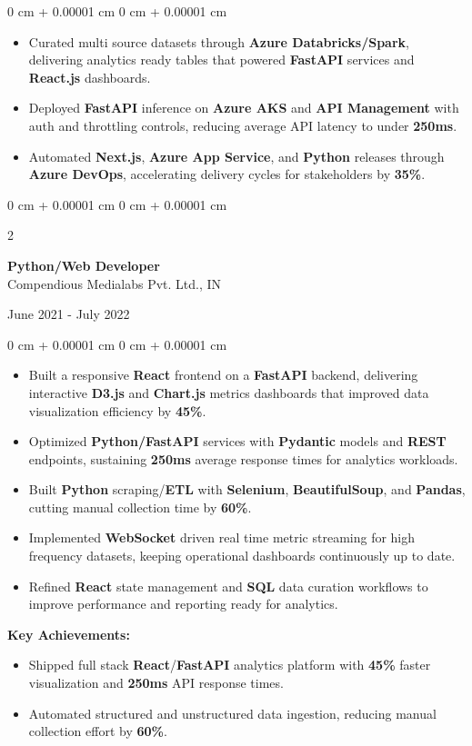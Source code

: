 \documentclass[10pt, letterpaper]{article}
\newenvironment{highlights}{
    \begin{itemize}[
        topsep=0.10 cm,
        parsep=0.10 cm,
        partopsep=0pt,
        itemsep=0pt,
        leftmargin=0 cm + 10pt
    ]
}{
    \end{itemize}
} %
\newenvironment{highlightsforbulletentries}{
    \begin{itemize}[
        topsep=0.10 cm,
        parsep=0.10 cm,
        partopsep=0pt,
        itemsep=0pt,
        leftmargin=10pt
    ]
}{
    \end{itemize}
} %
\newenvironment{onecolentry}{
    \begin{adjustwidth}{
        0 cm + 0.00001 cm
    }{
        0 cm + 0.00001 cm
    }
}{
    \end{adjustwidth}
} %
\newenvironment{twocolentry}[2][]{
    \onecolentry
    \def\secondColumn{#2}
    \setcolumnwidth{\fill, 4.5 cm}
    \begin{paracol}{2}
}{
    \switchcolumn \raggedleft \secondColumn
    \end{paracol}
    \endonecolentry
} %
\begin{document}
\begin{onecolentry}
\begin{highlightsforbulletentries}
	\item Curated multi source datasets through \textbf{Azure Databricks/Spark}, delivering analytics ready tables that powered \textbf{FastAPI} services and \textbf{React.js} dashboards.
	\item Deployed \textbf{FastAPI} inference on \textbf{Azure AKS} and \textbf{API Management} with auth and throttling controls, reducing average API latency to under \textbf{250ms}.
	\item Automated \textbf{Next.js}, \textbf{Azure App Service}, and \textbf{Python} releases through \textbf{Azure DevOps}, accelerating delivery cycles for stakeholders by \textbf{35\%}.
\end{highlightsforbulletentries}
\end{onecolentry}


\vspace{0.15 cm}
\begin{twocolentry}{
	June 2021 - July 2022
}
\textbf{Python/Web Developer}\\
Compendious Medialabs Pvt. Ltd., IN
\end{twocolentry}

\begin{onecolentry}
\begin{highlights}
	\item Built a responsive \textbf{React} frontend on a \textbf{FastAPI} backend, delivering interactive \textbf{D3.js} and \textbf{Chart.js} metrics dashboards that improved data visualization efficiency by \textbf{45\%}.
	\item Optimized \textbf{Python/FastAPI} services with \textbf{Pydantic} models and \textbf{REST} endpoints, sustaining \textbf{250ms} average response times for analytics workloads.
	\item Built \textbf{Python} scraping/\textbf{ETL} with \textbf{Selenium}, \textbf{BeautifulSoup}, and \textbf{Pandas}, cutting manual collection time by \textbf{60\%}.
	\item Implemented \textbf{WebSocket} driven real time metric streaming for high frequency datasets, keeping operational dashboards continuously up to date.
	\item Refined \textbf{React} state management and \textbf{SQL} data curation workflows to improve performance and reporting ready for analytics.
\end{highlights}

\textbf{Key Achievements:}
\begin{highlightsforbulletentries}
	\item Shipped full stack \textbf{React}/\textbf{FastAPI} analytics platform with \textbf{45\%} faster visualization and \textbf{250ms} API response times.
	\item Automated structured and unstructured data ingestion, reducing manual collection effort by \textbf{60\%}.
\end{highlightsforbulletentries}
\end{onecolentry}
\end{document}
